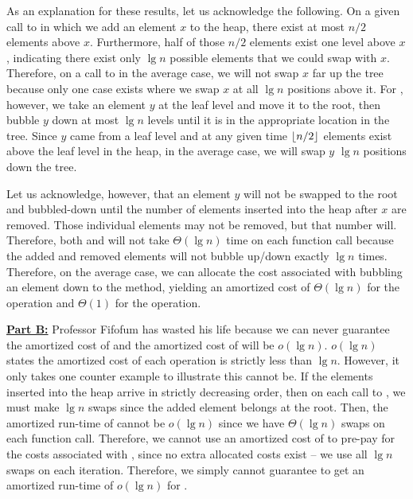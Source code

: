 \documentclass[11pt]{article}
\DeclarePairedDelimiter\floor{\lfloor}{\rfloor}
\begin{document}
As an explanation for these results, let us acknowledge the following. On a given call to  in which we add an element $x$ to the heap, there exist at most $n/2$ elements above $x$. Furthermore, half of those $n/2$ elements exist one level above $x$, indicating there exist only $\lg{n}$ possible elements that we could swap with $x$. Therefore, on a call to  in the average case, we will not swap $x$ far up the tree because only one case exists where we swap $x$ at all $\lg{n}$ positions above it. For , however, we take an element $y$ at the leaf level and move it to the root, then bubble $y$ down at most $\lg{n}$ levels until it is in the appropriate location in the tree. Since $y$ came from a leaf level and at any given time $\floor{n/2}$ elements exist above the leaf level in the heap, in the average case, we will swap $y$ $\lg{n}$ positions down the tree.

Let us acknowledge, however, that an element $y$ will not be swapped to the root and bubbled-down until the number of elements inserted into the heap after $x$ are removed. Those individual elements may not be removed, but that number will. Therefore, both  and  will not take $\Theta(\lg{n})$ time on each function call because the added and removed elements will not bubble up/down exactly $\lg{n}$ times. Therefore, on the average case, we can allocate the cost associated with bubbling an element down to the  method, yielding an amortized cost of $\Theta(\lg{n})$ for the  operation and $\Theta(1)$ for the  operation.

\textbf{\underline{Part B:}} Professor Fifofum has wasted his life because we can never guarantee the amortized cost of  and the amortized cost of  will be $o(\lg{n})$. $o(\lg{n})$ states the amortized cost of each operation is strictly less than $\lg{n}$. However, it only takes one counter example to illustrate this cannot be. If the elements inserted into the heap arrive in strictly decreasing order, then on each call to , we must make $\lg{n}$ swaps since the added element belongs at the root. Then, the amortized run-time of  cannot be $o(\lg{n})$ since we have $\Theta(\lg{n})$ swaps on each function call. Therefore, we cannot use an amortized cost of  to pre-pay for the costs associated with , since no extra allocated costs exist -- we use all $\lg{n}$ swaps on each iteration. Therefore, we simply cannot guarantee to get an amortized run-time of $o(\lg{n})$ for .
\end{document}
